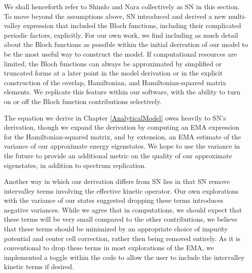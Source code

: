 We shall henceforth refer to Shindo and Nara collectively as SN in this section.
To move beyond the assumptions above, SN introduced and derived a new
multi-valley expression that included the Bloch functions, including their
complicated periodic factors, explicitly. For our own work, we find including as
much detail about the Bloch functions as possible within the initial derivation
of our model to be the most useful way to construct the model. If computational
resources are limited, the Bloch functions can always be approximated by
simplified or truncated forms at a later point in the model derivation or in the
explicit construction of the overlap, Hamiltonian, and Hamiltonian-squared
matrix elements. We replicate this feature within our software, with the ability
to turn on or off the Bloch function contributions selectively.

The equation we derive in Chapter \ref{AnalyticalModel} owes heavily to SN's
derivation, though we expand the derivation by computing an EMA expression for
the Hamiltonian-squared matrix, and by extension, an EMA estimate of the
variance of our approximate energy eigenstates. We hope to use the variance in
the future to provide an additional metric on the quality of our approximate
eigenstates, in addition to spectrum replication.

Another way in which our derivation differs from SN lies in that SN remove
intervalley terms involving the effective kinetic operator. Our own explorations
with the variance of our states suggested dropping these terms introduces
negative variances. While we agree that in computations, we should expect that
these terms will be very small compared to the other contributions, we believe
that these terms should be minimized by an appropriate choice of impurity
potential and center cell correction, rather then being removed entirely. As it
is conventional to drop these terms in most explorations of the EMA, we
implemented a toggle within the code to allow the user to include the
intervalley kinetic terms if desired.